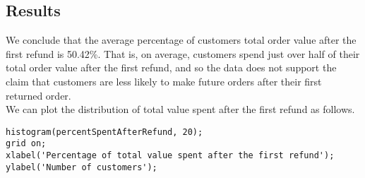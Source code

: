 \newpage
\subsection{Results}

We conclude that the average percentage of customers total order value after the first refund is 50.42\%. That is, on average, customers spend just over half of their total order value after the first refund, and so the data does not support the claim that customers are less likely to make future orders after their first returned order. \\

\noindent
We can plot the distribution of total value spent after the first refund as follows.
\begin{lstlisting}
histogram(percentSpentAfterRefund, 20);
grid on;
xlabel('Percentage of total value spent after the first refund');
ylabel('Number of customers');
\end{lstlisting}


